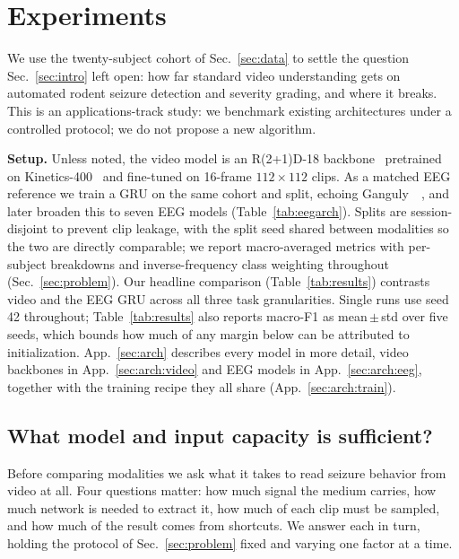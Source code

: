 \section{Experiments}
\label{sec:application}

We use the twenty-subject cohort of Sec.~\ref{sec:data} to settle the question
Sec.~\ref{sec:intro} left open: how far standard video understanding gets on
automated rodent seizure detection and severity grading, and where it breaks. This is an applications-track study: we benchmark
existing architectures under a controlled protocol; we do not propose a new
algorithm.

\noindent\textbf{Setup.}
Unless noted, the video model is an R(2+1)D-18
backbone~\cite{tran2018r2plus1d} pretrained on Kinetics-400~\cite{kay2017kinetics}
and fine-tuned on 16-frame $112\times112$ clips. As a matched EEG reference we
train a GRU on the same cohort and split, echoing
Ganguly~\etal~\cite{ganguly2025}, and later broaden this to seven EEG models
(Table~\ref{tab:eegarch}). Splits are session-disjoint to prevent clip leakage,
with the split seed shared between modalities so the two are directly comparable;
we report macro-averaged metrics with per-subject breakdowns and inverse-frequency
class weighting throughout (Sec.~\ref{sec:problem}). Our headline comparison
(Table~\ref{tab:results}) contrasts video and the EEG GRU across all three task
granularities. Single runs use seed 42 throughout; Table~\ref{tab:results} also
reports macro-F1 as mean\,$\pm$\,std over five seeds, which bounds how much of any
margin below can be attributed to initialization. App.~\ref{sec:arch} describes every model in more detail, video backbones in App.~\ref{sec:arch:video} and EEG models in App.~\ref{sec:arch:eeg}, together with the training recipe they all share (App.~\ref{sec:arch:train}).


\subsection{What model and input capacity is sufficient?}
\label{sec:rq1}

Before comparing modalities we ask what it takes to read seizure behavior from video
at all. Four questions matter: how much signal the medium carries, how much network is needed to extract it, how much of each clip must be sampled, and how much of the result comes from shortcuts. We answer each in turn, holding the protocol of Sec.~\ref{sec:problem} fixed and varying one factor at a time.

